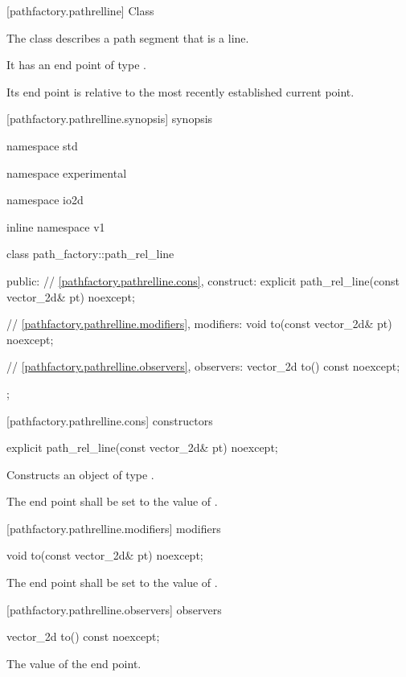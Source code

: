  [pathfactory.pathrelline] {Class }

\pnum
{}
The class  describes a path segment that is a line.

\pnum
It has an end point of type .

\pnum
Its end point is relative to the most recently established current point.

 [pathfactory.pathrelline.synopsis] { synopsis}

\begin{codeblock}
namespace std { namespace experimental { namespace io2d { inline namespace v1 {
  class path_factory::path_rel_line {
  public:
    // \ref{pathfactory.pathrelline.cons}, construct:
    explicit path_rel_line(const vector_2d& pt) noexcept;

    // \ref{pathfactory.pathrelline.modifiers}, modifiers:
    void to(const vector_2d& pt) noexcept;

    // \ref{pathfactory.pathrelline.observers}, observers:
    vector_2d to() const noexcept;
  };
} } } }
\end{codeblock}

 [pathfactory.pathrelline.cons] { constructors}

\begin{itemdecl}
    explicit path_rel_line(const vector_2d& pt) noexcept;
\end{itemdecl}
\begin{itemdescr}
	\pnum
	\effects
	Constructs an object of type .
	
	\pnum
	The end point shall be set to the value of .
\end{itemdescr}

 [pathfactory.pathrelline.modifiers]{ modifiers}

\begin{itemdecl}
    void to(const vector_2d& pt) noexcept;
\end{itemdecl}
\begin{itemdescr}
	\pnum
	\effects
	The end point shall be set to the value of .
\end{itemdescr}

 [pathfactory.pathrelline.observers]{ observers}

\begin{itemdecl}
    vector_2d to() const noexcept;
\end{itemdecl}
\begin{itemdescr}
	\pnum
	\returns
	The value of the end point.
\end{itemdescr}
